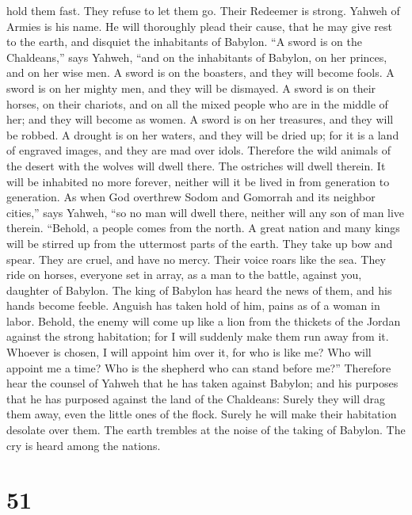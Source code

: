 hold them fast. They refuse to let them go.  Their Redeemer
is strong. Yahweh of Armies is his name. He will thoroughly plead their
cause, that he may give rest to the earth, and disquiet the inhabitants
of Babylon.  ``A sword is on the Chaldeans,'' says Yahweh,
``and on the inhabitants of Babylon, on her princes, and on her wise
men.  A sword is on the boasters, and they will become
fools. A sword is on her mighty men, and they will be dismayed.
 A sword is on their horses, on their chariots, and on all
the mixed people who are in the middle of her; and they will become as
women. A sword is on her treasures, and they will be robbed.
 A drought is on her waters, and they will be dried up; for
it is a land of engraved images, and they are mad over idols.
 Therefore the wild animals of the desert with the wolves
will dwell there. The ostriches will dwell therein. It will be inhabited
no more forever, neither will it be lived in from generation to
generation.  As when God overthrew Sodom and Gomorrah and
its neighbor cities,'' says Yahweh, ``so no man will dwell there,
neither will any son of man live therein.  ``Behold, a
people comes from the north. A great nation and many kings will be
stirred up from the uttermost parts of the earth.  They
take up bow and spear. They are cruel, and have no mercy. Their voice
roars like the sea. They ride on horses, everyone set in array, as a man
to the battle, against you, daughter of Babylon.  The king
of Babylon has heard the news of them, and his hands become feeble.
Anguish has taken hold of him, pains as of a woman in labor.
 Behold, the enemy will come up like a lion from the
thickets of the Jordan against the strong habitation; for I will
suddenly make them run away from it. Whoever is chosen, I will appoint
him over it, for who is like me? Who will appoint me a time? Who is the
shepherd who can stand before me?''  Therefore hear the
counsel of Yahweh that he has taken against Babylon; and his purposes
that he has purposed against the land of the Chaldeans: Surely they will
drag them away, even the little ones of the flock. Surely he will make
their habitation desolate over them.  The earth trembles at
the noise of the taking of Babylon. The cry is heard among the nations.

\hypertarget{section-50}{%
\section{51}\label{section-50}}

